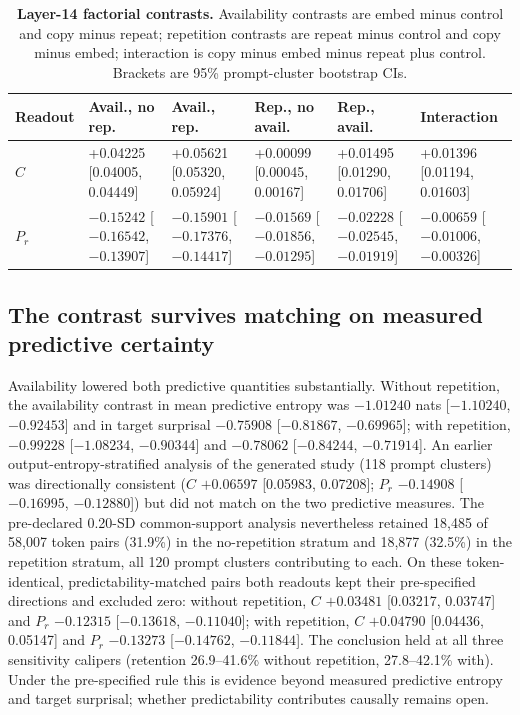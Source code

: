 \documentclass[10pt,a4paper,twocolumn]{article}
\begin{document}
\begin{table}[t]
\small
\begin{tabularx}{\textwidth}{@{}lYYYYY@{}}
\toprule
\textbf{Readout} & \textbf{Avail., no rep.} & \textbf{Avail., rep.}
& \textbf{Rep., no avail.} & \textbf{Rep., avail.} & \textbf{Interaction} \\
\midrule
\(C\) & +0.04225 [0.04005, 0.04449] & +0.05621 [0.05320, 0.05924]
& +0.00099 [0.00045, 0.00167] & +0.01495 [0.01290, 0.01706]
& +0.01396 [0.01194, 0.01603] \\
\(P_r\) & \(-0.15242\) [\(-0.16542\), \(-0.13907\)] & \(-0.15901\) [\(-0.17376\), \(-0.14417\)]
& \(-0.01569\) [\(-0.01856\), \(-0.01295\)] & \(-0.02228\) [\(-0.02545\), \(-0.01919\)]
& \(-0.00659\) [\(-0.01006\), \(-0.00326\)] \\
\bottomrule
\end{tabularx}
\caption{\textbf{Layer-14 factorial contrasts.} Availability contrasts are
embed minus control and copy minus repeat; repetition contrasts are repeat
minus control and copy minus embed; interaction is copy minus embed minus
repeat plus control. Brackets are 95\% prompt-cluster bootstrap CIs.}
\label{tab:factorial}
\end{table}

\subsection{The contrast survives matching on measured predictive certainty}

Availability lowered both predictive quantities substantially. Without
repetition, the availability contrast in mean predictive entropy was
\(-1.01240\) nats [\(-1.10240\), \(-0.92453\)] and in target surprisal
\(-0.75908\) [\(-0.81867\), \(-0.69965\)]; with repetition, \(-0.99228\)
[\(-1.08234\), \(-0.90344\)] and \(-0.78062\) [\(-0.84244\), \(-0.71914\)].
An earlier output-entropy-stratified analysis of the generated study (118
prompt clusters) was directionally consistent (\(C\) \(+0.06597\)
[0.05983, 0.07208]; \(P_r\) \(-0.14908\) [\(-0.16995\), \(-0.12880\)]) but
did not match on the two predictive measures. The
pre-declared 0.20-SD common-support analysis nevertheless retained 18,485 of
58,007 token pairs (31.9\%) in the no-repetition stratum and 18,877 (32.5\%)
in the repetition stratum, all 120 prompt clusters contributing to each. On
these token-identical, predictability-matched pairs both readouts kept their
pre-specified directions and excluded zero: without repetition, \(C\)
\(+0.03481\) [0.03217, 0.03747] and \(P_r\) \(-0.12315\)
[\(-0.13618\), \(-0.11040\)]; with repetition, \(C\) \(+0.04790\)
[0.04436, 0.05147] and \(P_r\) \(-0.13273\) [\(-0.14762\), \(-0.11844\)]. The
conclusion held at all three sensitivity calipers (retention 26.9--41.6\%
without repetition, 27.8--42.1\% with). Under the pre-specified rule this is
evidence beyond measured predictive entropy and target surprisal; whether
predictability contributes causally remains open.
\end{document}
